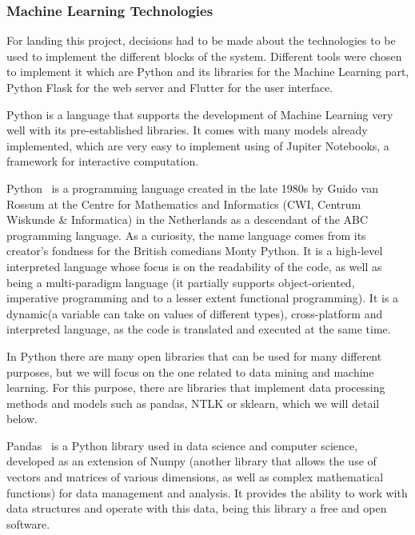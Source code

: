 \subsubsection{Machine Learning Technologies}
For landing this project, decisions had to be made about the technologies to be used to implement the different blocks of the system. Different tools were chosen to implement it which are Python and its libraries for the Machine Learning part, Python Flask for the web server and Flutter for the user interface.

Python is a language that supports the development of Machine Learning very well with its pre-established libraries. It comes with many models already implemented, which are very easy to implement using of Jupiter Notebooks, a framework for interactive computation.

Python~\cite{Welcomet44:online} is a programming language created in the late 1980s by Guido van Rossum at the Centre for Mathematics and Informatics (CWI, Centrum Wiskunde \& Informatica) in the Netherlands as a descendant of the ABC programming language. As a curiosity, the name language comes from its creator's fondness for the British comedians Monty Python. It is a high-level interpreted language whose focus is on the readability of the code, as well as being a multi-paradigm language (it partially supports object-oriented, imperative programming and to a lesser extent functional programming). It is a dynamic(a variable can take on values of different types), cross-platform and interpreted language, as the code is translated and executed at the same time.

In Python there are many open libraries that can be used for many different purposes, but we will focus on the one related to data mining and machine learning. For this purpose, there are libraries that implement data processing methods and models such as pandas, NTLK or sklearn, which we will detail below.

Pandas~\cite{pandasPy20:online} is a Python library used in data science and computer science, developed as an extension of Numpy (another library that allows the use of vectors and matrices of various dimensions, as well as complex mathematical functions) for data management and analysis. It provides the ability to work with data structures and operate with this data, being this library a free and open software.

